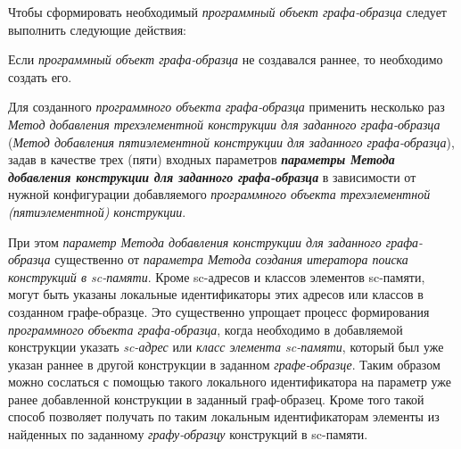 \begin{SCn}
\begin{scnsubstruct}
\begin{scnsubstruct}
\begin{scnsubstruct}
\end{scnsubstruct}

\end{scnsubstruct}

\end{scnsubstruct}
\end{SCn}

Чтобы сформировать необходимый \textit{программный объект графа-образца} следует выполнить следующие действия:
\begin{textitemize}
	\item Если \textit{программный объект графа-образца} не создавался раннее, то необходимо создать его.
	\item Для созданного \textit{программного объекта графа-образца} применить несколько раз \textit{Метод добавления трехэлементной конструкции для заданного графа-образца} (\textit{Метод добавления пятиэлементной конструкции для заданного графа-образца}), задав в качестве трех (пяти) входных параметров \textbf{\textit{параметры Метода добавления конструкции для заданного графа-образца}} в зависимости от нужной конфигурации добавляемого \textit{программного объекта трехэлементной (пятиэлементной) конструкции}.
\end{textitemize}

При этом \textit{параметр Метода добавления конструкции для заданного графа-образца} существенно  от \textit{параметра Метода создания итератора поиска конструкций в sc-памяти}. Кроме sc-адресов и классов элементов sc-памяти, могут быть указаны локальные идентификаторы этих адресов или классов в созданном графе-образце. Это существенно упрощает процесс формирования \textit{программного объекта графа-образца}, когда необходимо в добавляемой конструкции указать \textit{sc-адрес} или \textit{класс элемента sc-памяти\scnsupergroupsign}, который был уже указан раннее в другой конструкции в заданном \textit{графе-образце}. Таким образом можно сослаться с помощью такого локального идентификатора на параметр уже ранее добавленной конструкции в заданный граф-образец. Кроме того такой способ позволяет получать по таким локальным идентификаторам элементы из найденных по заданному \textit{графу-образцу} конструкций в sc-памяти.

